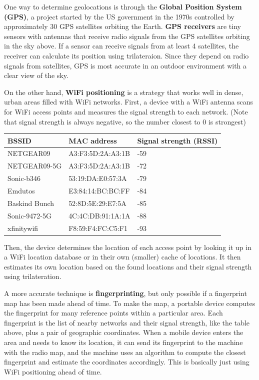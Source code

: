 \documentclass{article}
\begin{document}
  One way to determine geolocations is through the \textbf{Global Position System (GPS)}, a project started by the US government in the 1970s controlled by approximately 30 GPS satellites orbiting the Earth. \textbf{GPS receivers} are tiny sensors with antennas that receive radio signals from the GPS satellites orbiting in the sky above. If a sensor can receive signals from at least 4 satellites, the receiver can calculate its position using trilateraion. Since they depend on radio signals from satellites, GPS is most accurate in an outdoor environment with a clear view of the sky. 

  On the other hand, \textbf{WiFi positioning} is a strategy that works well in dense, urban areas filled with WiFi networks. First, a device with a WiFi antenna scans for WiFi access points and measures the signal strength to each network. (Note that signal strength is always negative, so the number closest to 0 is strongest)
  \begin{center}
  \begin{tabular}{l|l|l}
      BSSID & MAC address & Signal strength (RSSI) \\
      \hline
      NETGEAR09 & A3:F3:5D:2A:A3:1B & -59 \\
      NETGEAR09-5G & A3:F3:5D:2A:A3:1B & -72 \\
      Sonic-b346 & 53:19:DA:E0:57:3A & -79 \\
      Emdutos & E3:84:14:BC:BC:FF & -84 \\
      Baskind Bunch & 52:8D:5E:29:E7:5A & -85 \\
      Sonic-9472-5G & 4C:4C:DB:91:1A:1A & -88 \\
      xfinitywifi & F8:59:F4:FC:C5:F1	& -93
  \end{tabular}
  \end{center}
  Then, the device determines the location of each access point by looking it up in a WiFi location database or in their own (smaller) cache of locations. It then estimates its own location based on the found locations and their signal strength using trilateration. 

  A more accurate technique is \textbf{fingerprinting}, but only possible if a fingerprint map has been made ahead of time. To make the map, a portable device computes the fingerprint for many reference points within a particular area. Each fingerprint is the list of nearby networks and their signal strength, like the table above, plus a pair of geographic coordinates. When a mobile device enters the area and needs to know its location, it can send its fingerprint to the machine with the radio map, and the machine uses an algorithm to compute the closest fingerprint and estimate the coordinates accordingly. This is basically just using WiFi positioning ahead of time. 
\end{document}
